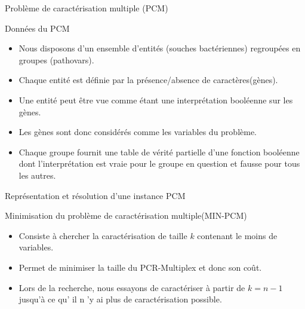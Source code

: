 \documentclass{beamer}
\begin{document}
\begin{frame}{Problème de caractérisation multiple (PCM)}
	\begin{block}{Données du PCM}
		\begin{itemize}
			\item Nous disposons d'un ensemble d'entités (souches bactériennes) regroupées en groupes (pathovars).
			\pause
			\item Chaque entité est définie par la présence/absence de caractères(gènes).
			\pause
			\item Une entité peut être vue comme étant une interprétation booléenne sur les gènes.
			\pause
			\item Les gènes sont donc considérés comme les variables du problème.
			\pause
			\item Chaque groupe fournit une table de vérité partielle d'une fonction booléenne dont l'interprétation est vraie pour le groupe en question et fausse pour tous les autres.  
		\end{itemize}
	\end{block}
\end{frame}

\begin{frame}{Représentation et résolution d'une instance PCM}
	\vspace{0.5cm}
	
\end{frame}

\begin{frame}{}
	\begin{block}{Minimisation du problème de caractérisation multiple(MIN-PCM)}
		\begin{itemize}
			\item Consiste à chercher la caractérisation de taille $k$ contenant le moins de variables.
			\pause
			\item Permet de minimiser la taille du PCR-Multiplex et donc son coût.
			\pause
			\item Lors de la recherche, nous essayons de caractériser à partir de $k=n-1$ jusqu'à ce qu' il n 'y ai plus de caractérisation possible.
		\end{itemize}
	\end{block}
\end{frame}
\end{document}
